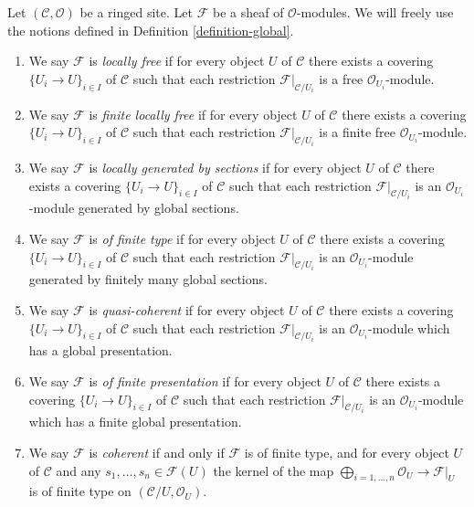 \begin{definition}
\label{definition-site-local}
Let $(\mathcal{C}, \mathcal{O})$ be a ringed site.
Let $\mathcal{F}$ be a sheaf of $\mathcal{O}$-modules.
We will freely use the notions defined in
Definition \ref{definition-global}.
\begin{enumerate}
\item We say $\mathcal{F}$ is {\it locally free}
if for every object $U$ of $\mathcal{C}$ there exists a covering
$\{U_i \to U\}_{i \in I}$ of $\mathcal{C}$ such that each restriction
$\mathcal{F}|_{\mathcal{C}/U_i}$ is a free
$\mathcal{O}_{U_i}$-module.
\item We say $\mathcal{F}$ is {\it finite locally free}
if for every object $U$ of $\mathcal{C}$ there exists a covering
$\{U_i \to U\}_{i \in I}$ of $\mathcal{C}$ such that each restriction
$\mathcal{F}|_{\mathcal{C}/U_i}$ is a finite free
$\mathcal{O}_{U_i}$-module.
\item We say $\mathcal{F}$ is {\it locally generated by sections}
if for every object $U$ of $\mathcal{C}$ there exists a covering
$\{U_i \to U\}_{i \in I}$ of $\mathcal{C}$ such that each restriction
$\mathcal{F}|_{\mathcal{C}/U_i}$ is an
$\mathcal{O}_{U_i}$-module generated by global sections.
\item We say $\mathcal{F}$ is {\it of finite type}
if for every object $U$ of $\mathcal{C}$ there exists a covering
$\{U_i \to U\}_{i \in I}$ of $\mathcal{C}$ such that each restriction
$\mathcal{F}|_{\mathcal{C}/U_i}$ is an
$\mathcal{O}_{U_i}$-module generated by finitely many global sections.
\item We say $\mathcal{F}$ is {\it quasi-coherent}
if for every object $U$ of $\mathcal{C}$ there exists a covering
$\{U_i \to U\}_{i \in I}$ of $\mathcal{C}$ such that each restriction
$\mathcal{F}|_{\mathcal{C}/U_i}$ is an
$\mathcal{O}_{U_i}$-module which has a global presentation.
\item We say $\mathcal{F}$ is {\it of finite presentation}
if for every object $U$ of $\mathcal{C}$ there exists a covering
$\{U_i \to U\}_{i \in I}$ of $\mathcal{C}$ such that each restriction
$\mathcal{F}|_{\mathcal{C}/U_i}$ is an
$\mathcal{O}_{U_i}$-module which has a finite global presentation.
\item We say $\mathcal{F}$ is {\it coherent} if and only if
$\mathcal{F}$ is of finite type, and for every object
$U$ of $\mathcal{C}$ and any $s_1, \ldots, s_n \in \mathcal{F}(U)$
the kernel of the map
$\bigoplus_{i = 1, \ldots, n} \mathcal{O}_U \to \mathcal{F}|_U$
is of finite type on $(\mathcal{C}/U, \mathcal{O}_U)$.
\end{enumerate}
\end{definition}

